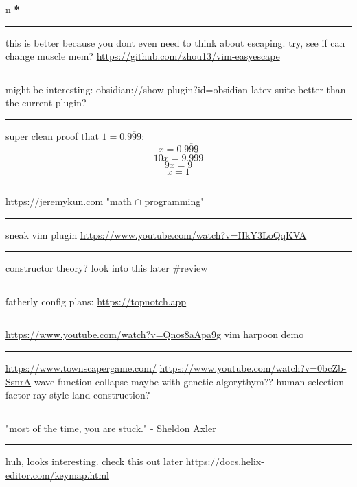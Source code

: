 \documentclass[letterpaper]{article}
\date{\today}
\title{}
\renewcommand{\tableofcontents}{}
\begin{document}
\tableofcontents

n \textbf{*}

\noindent\rule{\textwidth}{0.5pt}

this is better because you dont even need to think about escaping. try,
see if can change muscle mem? \url{https://github.com/zhou13/vim-easyescape}

\noindent\rule{\textwidth}{0.5pt}

might be interesting: obsidian://show-plugin?id=obsidian-latex-suite
better than the current plugin?

\noindent\rule{\textwidth}{0.5pt}

super clean proof that \(1 = 0. \overline{999}\):
\[x = 0.\overline{999}\] \[10x = 9.\overline{999}\] \[9x = 9\] \[x = 1\]

\noindent\rule{\textwidth}{0.5pt}

\url{https://jeremykun.com} "math \(\cap\) programming"

\noindent\rule{\textwidth}{0.5pt}

sneak vim plugin \url{https://www.youtube.com/watch?v=HkY3LoQqKVA}

\noindent\rule{\textwidth}{0.5pt}

constructor theory? look into this later \#review

\noindent\rule{\textwidth}{0.5pt}

fatherly config plans: \url{https://topnotch.app}

\noindent\rule{\textwidth}{0.5pt}

\url{https://www.youtube.com/watch?v=Qnos8aApa9g} vim harpoon demo

\noindent\rule{\textwidth}{0.5pt}

\href{https://www.youtube.com/redirect?event=video\_description\&redir\_token=QUFFLUhqbWU5b05DZzZyX0syeGltbVAzSUZGWkFySTFEZ3xBQ3Jtc0tuX1VZUTFUcHFsaklnd2FFYnlFV1pseDU3Q1hxMm40aWcybXVtMGNkVXhrYWVQaThuY0E2dXJNR2dkVm1rZ3A3NkVTZ2pJWEhVblVDV0ZKcXdFdFZTdHA5b3V4aXExVWFRLXVpeVhtSlpnNDhBYjU5Yw\&q=https\%3A\%2F\%2Fwww.townscapergame.com\%2F}{https://www.townscapergame.com/}
\url{https://www.youtube.com/watch?v=0bcZb-SsnrA} wave function collapse maybe
with genetic algorythym?? human selection factor ray style land
construction?

\noindent\rule{\textwidth}{0.5pt}

"most of the time, you are stuck." - Sheldon Axler

\noindent\rule{\textwidth}{0.5pt}

huh, looks interesting. check this out later
\url{https://docs.helix-editor.com/keymap.html}
\end{document}
